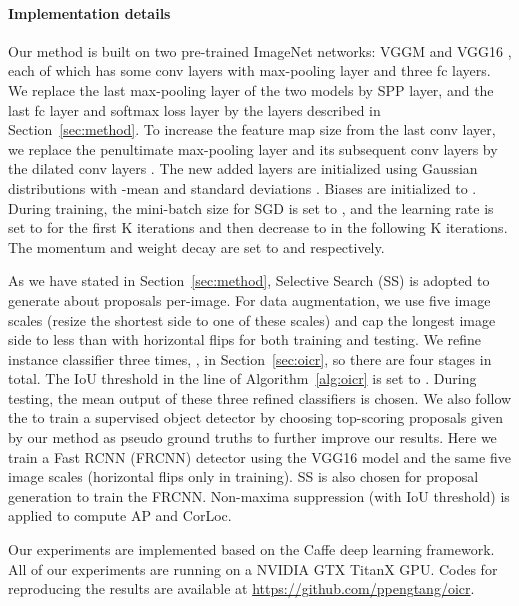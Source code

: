 \documentclass[10pt,twocolumn,letterpaper]{article}
\begin{document}
\paragraph{Implementation details}
Our method is built on two pre-trained ImageNet \cite{Ref:Deng2009} networks: VGGM \cite{Ref:Chatfield2014} and VGG16 \cite{Ref:Simonyan2015}, each of which has some conv layers with max-pooling layer and three fc layers.
We replace the last max-pooling layer of the two models by SPP layer, and the last fc layer and softmax loss layer by the layers described in Section~\ref{sec:method}.
To increase the feature map size from the last conv layer, we replace the penultimate max-pooling layer and its subsequent conv layers by the dilated conv layers \cite{Ref:Yu2016}.
The new added layers are initialized using Gaussian distributions with -mean and standard deviations .
Biases are initialized to .
During training, the mini-batch size for SGD is set to , and the learning rate is set to  for the first K iterations and then decrease to  in the following K iterations.
The momentum and weight decay are set to  and  respectively.

As we have stated in Section~\ref{sec:method}, Selective Search (SS) \cite{Ref:Uijlings2013} is adopted to generate about  proposals per-image.
For data augmentation, we use five image scales  (resize the shortest side to one of these scales) and cap the longest image side to less than  with horizontal flips for both training and testing.
We refine instance classifier three times, \ie,  in Section~\ref{sec:oicr}, so there are four stages in total.
The IoU threshold  in the  line of Algorithm~\ref{alg:oicr} is set to .
During testing, the mean output of these three refined classifiers is chosen.
We also follow the \cite{Ref:Kumar2016,Ref:Li2016} to train a supervised object detector by choosing top-scoring proposals given by our method as pseudo ground truths to further improve our results.
Here we train a Fast RCNN (FRCNN) \cite{Ref:Girshick2015} detector using the VGG16 model and the same five image scales (horizontal flips only in training).
SS is also chosen for proposal generation to train the FRCNN.
Non-maxima suppression (with  IoU threshold) is applied to compute AP and CorLoc.

Our experiments are implemented based on the Caffe \cite{Ref:Jia2014} deep learning framework.
All of our experiments are running on a NVIDIA GTX TitanX GPU.
Codes for reproducing the results are available at \url{https://github.com/ppengtang/oicr}.
\end{document}
